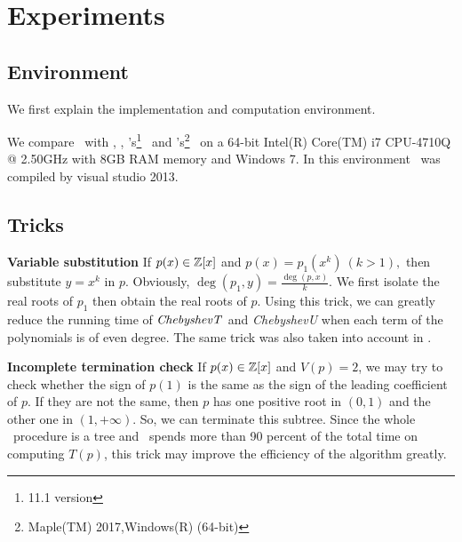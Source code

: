 
\section{Experiments}
\label{sec:exp}

\subsection{Environment}
We first explain the implementation and computation environment.
\begin{comment}
{\bf Old environment}\ \ \
The main algorithm for isolating real roots based on our improvements has been implemented as a \texttt{C} program, \froot \footnote{The program can be downloaded through \url{https://github.com/djuanbei/logcf}}. Compilation was done using {\tt gcc} version 4.6.3 with optimization flags -O2.
We use {\tt Singular} \cite{singular} to read polynomials from files or standard input and to eliminate multi-factors of polynomials. We use the GMP\footnote{ \url{http://gmplib.org/}}
(version 5.05), arbitrary-length integers libraries, to deal with big integer computation.
Some tests were done before 2014   on a 64-bit Intel(R) Core(TM) i5 CPU 650 @ 3.20GHz with 4GB RAM memory and Ubuntu 12.04 GNU/Linux.
\end{comment}
 We compare \froot\ with \SLV, \AND, \MM's\footnote{11.1 version} \inte\  and  \MAPLE's\footnote{Maple(TM) 2017,Windows(R) (64-bit)} \REALROOT\  on   a 64-bit Intel(R) Core(TM) i7 CPU-4710Q @ 2.50GHz with 8GB RAM memory and Windows 7. In this environment \froot\ was compiled by visual studio 2013.

\subsection{Tricks}
{\bf Variable substitution}
If $p(x)\in {\mathbb Z}[x]$ and $p(x)=p_1(x^k)\ (k>1),$ then substitute $y=x^k$ in $p$. Obviously, $\deg(p_1,y)=\frac{\deg(p,x)}{k}$. We first isolate the real roots of $p_1$ then
obtain the real roots of $p$. Using this trick, we can greatly reduce the running time of ${\it ChebyshevT}$
and {\it ChebyshevU} when each term of the polynomials is of even degree. The same trick was also taken into account in \cite{johnson06}.

{\bf Incomplete termination check}
If $p(x)\in {\mathbb Z}[x]$ and $V(p)= 2$, we may try to check whether the sign of $p(1)$ is the same as the sign of the leading coefficient of $p$. If they are not the same, then $p$  has one positive root in $(0,1)$ and the other one in $(1,+\infty)$. So, we can terminate this subtree. Since the whole \froot\ procedure is a tree and \froot\ spends more than 90 percent of the
total time on computing $T(p)$, this trick may improve the efficiency of the algorithm greatly.

